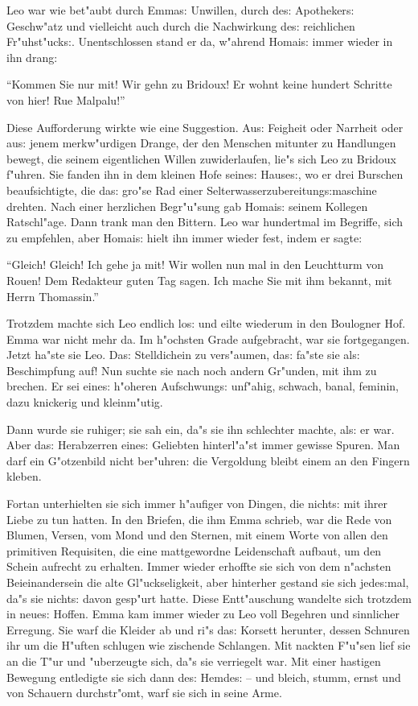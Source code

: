 \documentclass[oneside,12pt]{book}
\newcommand{\s}{s:}%
\begin{document}
Leo war wie bet"aubt durch Emma{\s} Unwillen, durch de{\s}
Apotheker{\s} Geschw"atz und vielleicht auch durch die Nachwirkung
de{\s} reichlichen Fr"uh\-st"uck{\s}. Unentschlossen stand er da,
w"ahrend Homai{\s} immer wieder in ihn drang:

"`Kommen Sie nur mit! Wir gehn zu Bridoux! Er wohnt keine hundert
Schritte von hier! Rue Malpalu!"'

Diese Aufforderung wirkte wie eine Suggestion. Au{\s} Feigheit
oder Narrheit oder au{\s} jenem merkw"urdigen Drange, der den
Menschen mitunter zu Handlungen bewegt, die seinem eigentlichen
Willen zuwiderlaufen, lie"s sich Leo zu Bridoux f"uhren. Sie
fanden ihn in dem kleinen Hofe seine{\s} Hause{\s}, wo er drei
Burschen beaufsichtigte, die da{\s} gro"se Rad einer
Selterwasserzubereitung{\s}maschine drehten. Nach einer herzlichen
Begr"u"sung gab Homai{\s} seinem Kollegen Ratschl"age. Dann trank
man den Bittern. Leo war hundertmal im Begriffe, sich zu
empfehlen, aber Homai{\s} hielt ihn immer wieder fest, indem er
sagte:

"`Gleich! Gleich! Ich gehe ja mit! Wir wollen nun mal in den
{\glq}Leuchtturm von Rouen{\grq}! Dem Redakteur guten Tag sagen.
Ich mache Sie mit ihm bekannt, mit Herrn Thomassin."'

Trotzdem machte sich Leo endlich lo{\s} und eilte wiederum in den
Boulogner Hof. Emma war nicht mehr da. Im h"ochsten Grade
aufgebracht, war sie fortgegangen. Jetzt ha"ste sie Leo. Da{\s}
Stelldichein zu vers"aumen, da{\s} fa"ste sie al{\s} Beschimpfung
auf! Nun suchte sie nach noch andern Gr"unden, mit ihm zu brechen.
Er sei eine{\s} h"oheren Aufschwung{\s} unf"ahig, schwach, banal,
feminin, dazu knickerig und kleinm"utig.

Dann wurde sie ruhiger; sie sah ein, da"s sie ihn schlechter
machte, al{\s} er war. Aber da{\s} Herabzerren eine{\s} Geliebten
hinterl"a"st immer gewisse Spuren. Man darf ein G"otzenbild nicht
ber"uhren: die Vergoldung bleibt einem an den Fingern kleben.

Fortan unterhielten sie sich immer h"aufiger von Dingen, die
nicht{\s} mit ihrer Liebe zu tun hatten. In den Briefen, die ihm
Emma schrieb, war die Rede von Blumen, Versen, vom Mond und den
Sternen, mit einem Worte von allen den primitiven Requisiten, die
eine mattgewordne Leidenschaft aufbaut, um den Schein aufrecht zu
erhalten. Immer wieder erhoffte sie sich von dem n"achsten
Beieinandersein die alte Gl"uckseligkeit, aber hinterher gestand
sie sich jede{\s}mal, da"s sie nicht{\s} davon gesp"urt hatte.
Diese Entt"auschung wandelte sich trotzdem in neue{\s} Hoffen.
Emma kam immer wieder zu Leo voll Begehren und sinnlicher
Erregung. Sie warf die Kleider ab und ri"s da{\s} Korsett
herunter, dessen Schnuren ihr um die H"uften schlugen wie
zischende Schlangen. Mit nackten F"u"sen lief sie an die T"ur und
"uberzeugte sich, da"s sie verriegelt war. Mit einer hastigen
Bewegung entledigte sie sich dann de{\s} Hemde{\s} -- und bleich,
stumm, ernst und von Schauern durchstr"omt, warf sie sich in seine
Arme.
\end{document}
